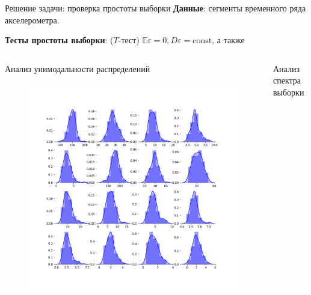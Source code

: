 \documentclass{beamer}
\newcommand{\eps}{\varepsilon}
\begin{document}
\begin{frame}{Решение задачи: проверка простоты выборки}
    \textbf{Данные}: сегменты временного ряда акселерометра.

    \textbf{Тесты простоты выборки}: ($T$-тест) $\mathbb{E} \eps = 0, D \eps = \mathrm{const}$, а также

    \begin{columns}[T] %
        \begin{column}{.48\textwidth}
        Анализ унимодальности распределений

    \begin{figure}[ht]
        \centering
          \includegraphics[width=\textwidth]{../pics/features_unimodality_short.png}
    \end{figure}

        \end{column}%
        \hfill%
        \begin{column}{.48\textwidth}
        Анализ спектра выборки


\end{column}
\end{columns}
\end{frame}
\end{document}
